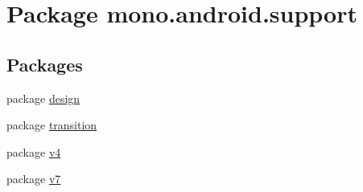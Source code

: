 \hypertarget{namespacemono_1_1android_1_1support}{
\section{Package mono.android.support}
\label{namespacemono_1_1android_1_1support}
}
\subsection*{Packages}
\begin{CompactItemize}
\item 
package \hyperlink{namespacemono_1_1android_1_1support_1_1design}{design}
\item 
package \hyperlink{namespacemono_1_1android_1_1support_1_1transition}{transition}
\item 
package \hyperlink{namespacemono_1_1android_1_1support_1_1v4}{v4}
\item 
package \hyperlink{namespacemono_1_1android_1_1support_1_1v7}{v7}
\end{CompactItemize}
